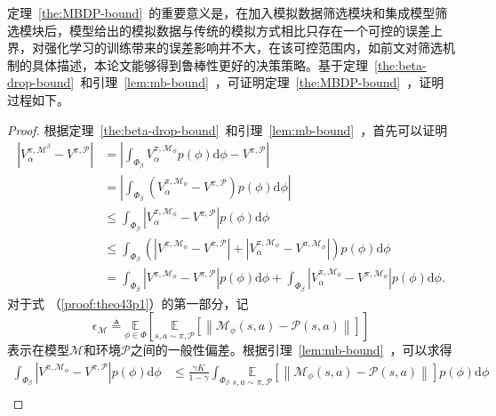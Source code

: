 定理~\ref{the:MBDP-bound}~的重要意义是，在加入模拟数据筛选模块和集成模型筛选模块后，模型给出的模拟数据与传统的模拟方式相比只存在一个可控的误差上界，对强化学习的训练带来的误差影响并不大，在该可控范围内，如前文对筛选机制的具体描述，本论文能够得到鲁棒性更好的决策策略。基于定理~\ref{the:beta-drop-bound}~和引理~\ref{lem:mb-bound}~，可证明定理~\ref{the:MBDP-bound}~，证明过程如下。

\begin{proof}

根据定理~\ref{the:beta-drop-bound}~和引理~\ref{lem:mb-bound}~，首先可以证明
\begin{equation}
\begin{aligned}
\left|{V}_\alpha^{\pi, \mathcal{M}^\beta}-{V}^{\pi, \mathcal{P}}\right|&=\left|\int_{\Phi_\beta}{V}_\alpha^{\pi, \mathcal{M}_{\phi}}p(\phi)\mathrm{d}\phi-{V}^{\pi, \mathcal{P}}\right| \\
&=\left|\int_{\Phi_\beta}\left({V}_\alpha^{\pi, \mathcal{M}_{\phi}}-{V}^{\pi, \mathcal{P}}\right)p(\phi)\mathrm{d}\phi\right| \\
&\leq\int_{\Phi_\beta}\left|{V}_\alpha^{\pi, \mathcal{M}_{\phi}}-{V}^{\pi, \mathcal{P}}\right|p(\phi)\mathrm{d}\phi\\
&\leq\int_{\Phi_\beta}\left(\left|{V}^{\pi, \mathcal{M}_{\phi}}-{V}^{\pi, \mathcal{P}}\right|+\left|{V}_\alpha^{\pi, \mathcal{M}_{\phi}} - {V}^{\pi,\mathcal{M}_{\phi}}\right|\right)p(\phi)\mathrm{d}\phi\\
&= \int_{\Phi_\beta}\left|{V}^{\pi, \mathcal{M}_{\phi}}-{V}^{\pi, \mathcal{P}}\right|p(\phi)\mathrm{d}\phi+\int_{\Phi_\beta}\left|{V}_\alpha^{\pi, \mathcal{M}_{\phi}} - {V}^{\pi,\mathcal{M}_{\phi}}\right|p(\phi)\mathrm{d}\phi. \label{proof:theo43p1}
\end{aligned}
\end{equation}
对于式 （\ref{proof:theo43p1}）的第一部分，记
\begin{equation}
\epsilon_{\mathcal{M}}\triangleq\underset{\phi\in\Phi}{\mathbb{E}}\left[\underset{s,a\sim \pi,\mathcal{P}}{\mathbb{E}}\left[\left\|\mathcal{M}_\phi(s, a)-\mathcal{P}(s, a)\right\|\right]\right]
\end{equation}
表示在模型$\mathcal{M}$和环境$\mathcal{P}$之间的一般性偏差。根据引理~\ref{lem:mb-bound}~，可以求得
\begin{equation}
\begin{aligned}
\int_{\Phi_\beta}\left|{V}^{\pi, \mathcal{M}_{\phi}}-{V}^{\pi, \mathcal{P}}\right|p(\phi)\mathrm{d}\phi &\leq \frac{\gamma K}{1-\gamma}\int_{\Phi_\beta}\underset{s,a\sim\pi,\mathcal{P}}{\mathbb{E}}\left[\left\|\mathcal{M}_\phi(s, a)-\mathcal{P}(s, a)\right\|\right]p(\phi)\mathrm{d}\phi\\

\end{aligned}
\end{equation}
\end{proof}

